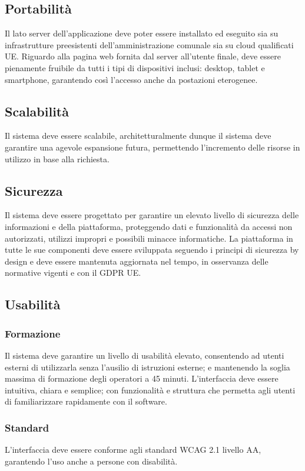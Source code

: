 \subsection{Portabilità}
Il lato server dell'applicazione deve poter essere installato ed eseguito sia su infrastrutture preesistenti dell’amministrazione comunale sia su cloud qualificati UE. Riguardo alla pagina web fornita dal server all'utente finale, deve essere pienamente fruibile da tutti i tipi di dispositivi inclusi: desktop, tablet e smartphone, garantendo così l’accesso anche da postazioni eterogenee.

\subsection{Scalabilità}
Il sistema deve essere scalabile, architetturalmente dunque il sistema deve garantire una agevole espansione futura, permettendo l’incremento delle risorse in utilizzo in base alla richiesta.

\subsection{Sicurezza}
Il sistema deve essere progettato per garantire un elevato livello di sicurezza delle informazioni e della piattaforma, proteggendo dati e funzionalità da accessi non autorizzati, utilizzi impropri e possibili minacce informatiche. La piattaforma in tutte le sue componenti deve essere sviluppata seguendo i principi di sicurezza by design e deve essere mantenuta aggiornata nel tempo, in osservanza delle normative vigenti e con il GDPR UE.

\subsection{Usabilità}
\subsubsection{Formazione}
Il sistema deve garantire un livello di usabilità elevato, consentendo ad utenti esterni di utilizzarla senza l’ausilio di istruzioni esterne; e mantenendo la soglia massima di formazione degli operatori a 45 minuti. L’interfaccia deve essere intuitiva, chiara e semplice; con funzionalità e struttura che permetta agli utenti di familiarizzare rapidamente con il software.
\subsubsection{Standard}
 L’interfaccia deve essere conforme agli standard WCAG 2.1 livello AA, garantendo l’uso anche a persone con disabilità.
